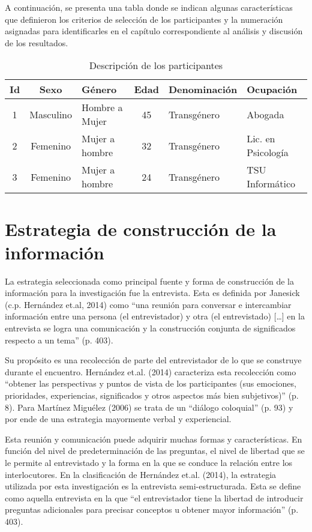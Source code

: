 A continuación, se presenta una tabla donde se indican algunas características
que definieron los criterios de selección de los participantes y la numeración
asignadas para identificarles en el capítulo correspondiente al análisis y
discusión de los resultados.

\begin{table}[]
    \caption{Descripción de los participantes}
    \label{tab:participantes}
    \centering
    \renewcommand{\tabcolsep}{1pt}
    \begin{tabularx}{\textwidth}{@{}ccXcXX@{}}
    \toprule
    Id & Sexo & Género         & Edad & Denominación & Ocupación
    \\ \midrule
    1            & Masculino      & Hombre a Mujer & 45   & Transgénero      & Abogada            \\
    2            & Femenino       & Mujer a hombre & 32   & Transgénero      & Lic. en Psicología \\
    3            & Femenino       & Mujer a hombre & 24   & Transgénero      & TSU Informático    \\ \bottomrule
    \end{tabularx}
\end{table}

\section{Estrategia de construcción de la información}
La estrategia seleccionada como principal fuente y forma de construcción de la
información para la investigación fue la entrevista.
Esta es definida por Janesick (c.p. Hernández et.al, 2014) como “una reunión
para conversar e intercambiar información entre una persona (el entrevistador) y
otra (el entrevistado) […] en la entrevista se logra una comunicación y la
construcción conjunta de significados respecto a un tema” (p. 403).

Su propósito es una recolección de parte del entrevistador de lo que se construye
durante el encuentro. Hernández et.al. (2014) caracteriza esta recolección como
“obtener las perspectivas y puntos de vista de los participantes (sus emociones,
prioridades, experiencias, significados y otros aspectos más bien subjetivos)”
(p. 8).
Para Martínez Miguélez (2006) se trata de un “diálogo coloquial” (p. 93) y por
ende de una estrategia mayormente verbal y experiencial.

Esta reunión y comunicación puede adquirir muchas formas y características.
En función del nivel de predeterminación de las preguntas, el nivel de libertad
que se le permite al entrevistado y la forma en la que se conduce la relación
entre los interlocutores.
En la clasificación de Hernández et.al. (2014), la estrategia utilizada por
esta investigación es la entrevista semi-estructurada.
Esta se define como aquella entrevista en la que “el entrevistador tiene la
libertad de introducir preguntas adicionales para precisar conceptos u obtener
mayor información” (p. 403).

